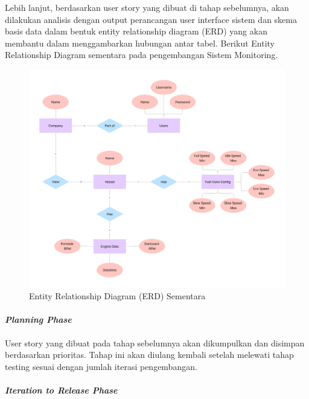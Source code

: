     Lebih lanjut, berdasarkan user story yang dibuat di tahap sebelumnya, akan dilakukan analisis dengan output perancangan user interface sistem dan skema basis data dalam bentuk entity relationship diagram (ERD) yang akan membantu dalam menggambarkan hubungan antar tabel. Berikut Entity Relationship Diagram sementara pada pengembangan Sistem Monitoring.


    \begin{figure}[!h]
        \includegraphics[width=1\linewidth, center]{images/metode/erd.png}
        \caption{Entity Relationship Diagram (ERD) Sementara}
        \label{fig:erd}
    \end{figure}

    \paragraph{\textit{Planning Phase}}

    User story yang dibuat pada tahap sebelumnya akan dikumpulkan dan disimpan berdasarkan prioritas. Tahap ini akan diulang kembali setelah melewati tahap testing sesuai dengan jumlah iterasi pengembangan.

    \paragraph{\textit{Iteration to Release Phase}}

